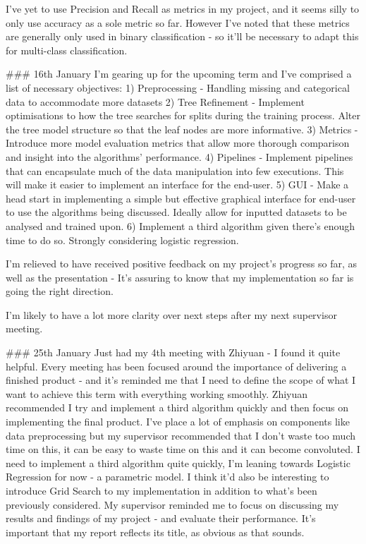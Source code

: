 \documentclass[letterpaper,10pt]{article}
\begin{document}
\begin{markdown}
I've yet to use Precision and Recall as metrics in my project, and it seems silly to only use accuracy as a sole metric so far. However I've noted that these metrics are generally only used in binary classification - so it'll be necessary to adapt this for multi-class classification. 
  
### 16th January
I'm gearing up for the upcoming term and I've comprised a list of necessary objectives:
  1) Preprocessing - Handling missing and categorical data to accommodate more datasets
  2) Tree Refinement - Implement optimisations to how the tree searches for splits during the training process. Alter the tree model structure so that the leaf nodes are more informative.
  3) Metrics - Introduce more model evaluation metrics that allow more thorough comparison and insight into the algorithms' performance. 
  4) Pipelines - Implement pipelines that can encapsulate much of the data manipulation into few executions. This will make it easier to implement an interface for the end-user. 
  5) GUI - Make a head start in implementing a simple but effective graphical interface for end-user to use the algorithms being discussed. Ideally allow for inputted datasets to be analysed and trained upon. 
  6) Implement a third algorithm given there's enough time to do so. Strongly considering logistic regression.  
    
I'm relieved to have received positive feedback on my project's progress so far, as well as the presentation - It's assuring to know that my implementation so far is going the right direction.  
  
I'm likely to have a lot more clarity over next steps after my next supervisor meeting. 
  
### 25th January
Just had my 4th meeting with Zhiyuan - I found it quite helpful. Every meeting has been focused around the importance of delivering a finished product - and it's reminded me that I need to define the scope of what I want to achieve this term with everything working smoothly. Zhiyuan recommended I try and implement a third algorithm quickly and then focus on implementing the final product.  
I've place a lot of emphasis on components like data preprocessing but my supervisor recommended that I don't waste too much time on this, it can be easy to waste time on this and it can become convoluted.  
I need to implement a third algorithm quite quickly, I'm leaning towards Logistic Regression for now - a parametric model. I think it'd also be interesting to introduce Grid Search to my implementation in addition to what's been previously considered. 
My supervisor reminded me to focus on discussing my results and findings of my project - and evaluate their performance. It's important that my report reflects its title, as obvious as that sounds.
  

\end{markdown}
\end{document}

